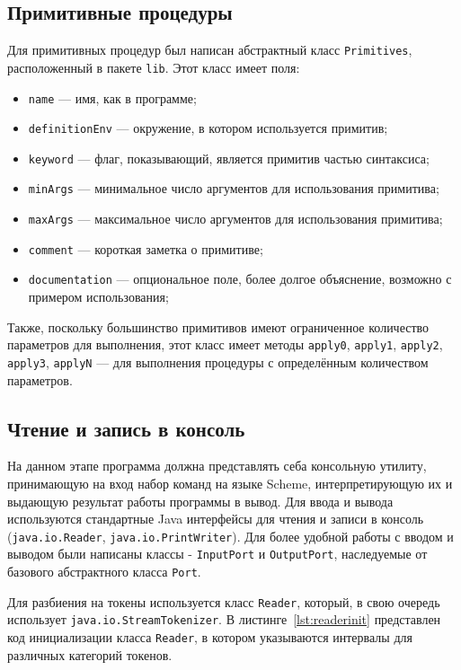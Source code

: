 \documentclass[14pt, russian]{scrartcl}
\begin{document}
\subsection{Примитивные процедуры}

Для примитивных процедур был написан абстрактный класс \texttt{Primitives}, расположенный в пакете \texttt{lib}. Этот класс имеет поля:
\begin{itemize} %
\item \texttt{name} --- имя, как в программе;
\item \texttt{definitionEnv} --- окружение, в котором используется примитив;
\item \texttt{keyword} --- флаг, показывающий, является примитив частью синтаксиса;
\item \texttt{minArgs} --- минимальное число аргументов для использования примитива;
\item \texttt{maxArgs} --- максимальное число аргументов для использования примитива;
\item \texttt{comment} --- короткая заметка о примитиве;
\item \texttt{documentation} --- опциональное поле, более долгое объяснение, возможно с примером использования;
\end{itemize}

Также, поскольку большинство примитивов имеют ограниченное количество параметров для выполнения, этот класс имеет методы \texttt{apply0}, \texttt{apply1}, \texttt{apply2}, \texttt{apply3}, \texttt{applyN} --- для выполнения процедуры с определённым количеством параметров.

\subsection{Чтение и запись в консоль}

На данном этапе программа должна представлять себа консольную утилиту, принимающую на вход набор команд на языке Scheme, интерпретирующую их и выдающую результат работы программы в вывод. Для ввода и вывода используются стандартные Java интерфейсы для чтения и записи в консоль (\texttt{java.io.Reader}, \texttt{java.io.PrintWriter}). Для более удобной работы с вводом и выводом были написаны классы - \texttt{InputPort} и \texttt{OutputPort}, наследуемые от базового абстрактного класса \texttt{Port}.

Для разбиения на токены используется класс \texttt{Reader}, который, в свою очередь использует \texttt{java.io.StreamTokenizer}. В листинге~\ref{lst:readerinit} представлен код инициализации класса \texttt{Reader}, в  котором указываются интервалы для различных категорий токенов.
\end{document}
